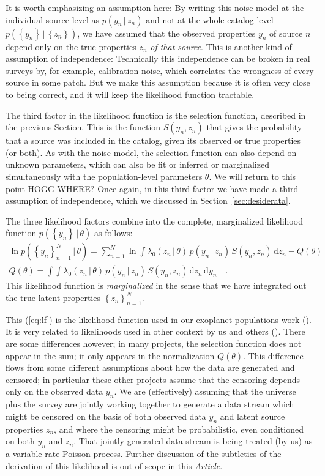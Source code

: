 \documentclass[modern]{aastex62}
\newcommand{\dd}{\mathrm{d}}
\newcommand{\given}{\,|\,}
\newcommand{\set}[1]{\left\{{#1}\right\}}
\newcommand{\documentname}{\textsl{Article}}
\newcommand{\sectionname}{Section}
\begin{document}
It is worth emphasizing an assumption here:
By writing this noise model at the individual-source level as
$p(y_n\given z_n)$
and not at the whole-catalog level
$p(\set{y_n}\given\set{z_n})$,
we have assumed that the observed properties $y_n$ of source $n$
depend only on the true properties $z_n$ \emph{of that source}.
This is another kind of assumption of independence:
Technically this independence can be broken in real surveys by,
for example, calibration noise, which correlates the wrongness of
every source in some patch.
But we make this assumption because it is often very close to being
correct, and it will keep the likelihood function tractable.

The third factor in the likelihood function is the selection function,
described in the previous \sectionname.
This is the function $S(y_n,z_n)$ that gives the probability that a
source was included in the catalog, given its observed or true
properties (or both).
As with the noise model, the selection function can also depend on
unknown parameters, which can also be fit or inferred or marginalized
simultaneously with the population-level parameters $\theta$.
We will return to this point HOGG WHERE?
Once again, in this third factor we have made a third assumption of
independence, which we discussed in \sectionname~\ref{sec:desiderata}.

The three likelihood factors combine into the complete, marginalized
likelihood function $p(\set{y_n}\given\theta)$ as follows:
\begin{gather}
\ln p(\set{y_n}_{n=1}^{N}\given\theta)
 = \sum_{n=1}^N \ln\int\lambda_0(z_n\given \theta)\,p(y_n\given z_n)\,S(y_n, z_n)\,\dd z_n - Q(\theta)
\label{eq:lf}
\\
Q(\theta) = \int\!\int\lambda_0(z_n\given \theta)\,p(y_n\given z_n)\,S(y_n, z_n)\,\dd z_n\,\dd y_n
\quad .
\end{gather}
This likelihood function is \emph{marginalized} in the sense that we
have integrated out the true latent properties $\set{z_n}_{n=1}^N$.

This (\ref{eq:lf}) is the likelihood function used in our exoplanet
populations work (\citealt{exopop}).
It is very related to likelihoods
used in other context by us and others (\citealt{marshall, loredogrb, bernstein,
  bovy, mfg}).
There are some differences however;
in many projects, the selection function
does not appear in the sum; it only appears in the normalization $Q(\theta)$.
This difference flows from some different assumptions about how the
data are generated and censored; in particular these other projects assume
that the censoring depends only on the observed data $y_n$.
We are (effectively) assuming that the universe plus the survey are
jointly working together to generate a data stream which might be
censored on the basis of both observed data $y_n$ and latent source
properties $z_n$, and where the censoring might be probabilistic, even
conditioned on both $y_n$ and $z_n$.
That jointly generated data stream is being treated (by us) as a
variable-rate Poisson process.
Further discussion of the subtleties of the derivation of this
likelihood is out of scope in this \documentname.
\end{document}
